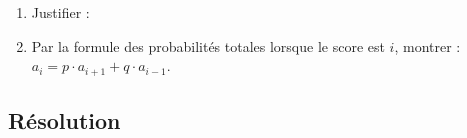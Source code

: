 \documentclass[12pt]{article}
\begin{document}
\begin{enumerate}[resume]
  \item Justifier : \quad 
    \moinsLigne
  \item
    Par la formule des probabilités totales lorsque le score est $i$, montrer : \quad $a_{i} = p \cdot a_{i+1} + q \cdot a_{i-1}$.
\end{enumerate}
\subsection{Résolution}
\end{document}
